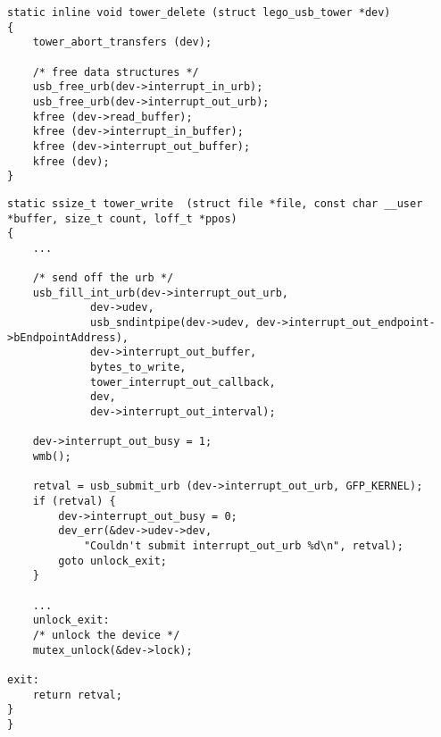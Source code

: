 \documentclass{article}
\begin{document}
\begin{lstlisting}[style=CStyle]
static inline void tower_delete (struct lego_usb_tower *dev)
{
	tower_abort_transfers (dev);

	/* free data structures */
	usb_free_urb(dev->interrupt_in_urb);
	usb_free_urb(dev->interrupt_out_urb);
	kfree (dev->read_buffer);
	kfree (dev->interrupt_in_buffer);
	kfree (dev->interrupt_out_buffer);
	kfree (dev);
}
\end{lstlisting}
\begin{lstlisting}[style=CStyle]
static ssize_t tower_write	(struct file *file, const char __user *buffer, size_t count, loff_t *ppos)
{
	...
	
	/* send off the urb */
	usb_fill_int_urb(dev->interrupt_out_urb,
			 dev->udev,
			 usb_sndintpipe(dev->udev, dev->interrupt_out_endpoint->bEndpointAddress),
			 dev->interrupt_out_buffer,
			 bytes_to_write,
			 tower_interrupt_out_callback,
			 dev,
			 dev->interrupt_out_interval);

	dev->interrupt_out_busy = 1;
	wmb();

	retval = usb_submit_urb (dev->interrupt_out_urb, GFP_KERNEL);
	if (retval) {
		dev->interrupt_out_busy = 0;
		dev_err(&dev->udev->dev,
			"Couldn't submit interrupt_out_urb %d\n", retval);
		goto unlock_exit;
	}	
	
	...
	unlock_exit:
	/* unlock the device */
	mutex_unlock(&dev->lock);

exit:
	return retval;
}
}
\end{lstlisting}
\end{document}
